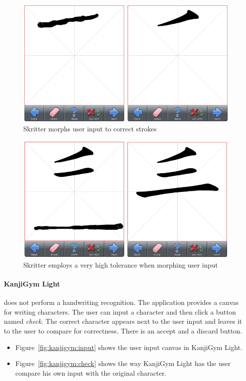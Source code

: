 \begin{figure}[htbp]
\begin{center}
\includegraphics[scale=0.7]{images/ConceptualDesign/skritter/morphInputToCorrectStroke.png}
\caption{Skritter morphs user input to correct strokes}
\label{fig:skritter:morphInputToCorrectStroke}
\end{center}
\end{figure}

\begin{figure}[htbp]
\begin{center}
\includegraphics[scale=0.7]{images/ConceptualDesign/skritter/highToleranceForMorphing.png}
\caption{Skritter employs a very high tolerance when morphing user input}
\label{fig:skritter:highToleranceForMorphing}
\end{center}
\end{figure}

\paragraph{KanjiGym Light} does not perform a handwriting recognition. 
The application provides a canvas for writing characters. The user 
can input a character and then click a button named \emph{check}. The correct 
character appears next to the user input and leaves it to the user to compare 
for correctness. There is an accept and a discard button.
\begin{itemize}
\item Figure~\ref{fig:kanjigym:input} shows the user input canvas in 
      KanjiGym Light.
\item Figure~\ref{fig:kanjigym:check} shows the way KanjiGym Light has the 
      user compare his own input with the original character.
\end{itemize}

